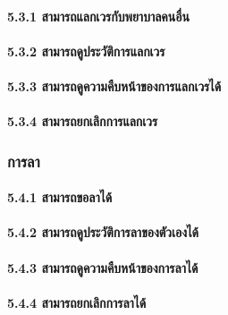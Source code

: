 \hspace{2.5cm}\paragraph{5.3.1 สามารถแลกเวรกับพยาบาลคนอื่น}

\hspace{2.5cm}\paragraph{5.3.2 สามารถดูประวัติการแลกเวร}

\hspace{2.5cm}\paragraph{5.3.3 สามารถดูความคืบหน้าของการแลกเวรได้}

\hspace{2.5cm}\paragraph{5.3.4 สามารถยกเลิกการแลกเวร}

\hspace{1cm}\subsubsection{การลา}

\hspace{2.5cm}\paragraph{5.4.1 สามารถขอลาได้}

\hspace{2.5cm}\paragraph{5.4.2 สามารถดูประวัติการลาของตัวเองได้}

\hspace{2.5cm}\paragraph{5.4.3 สามารถดูความคืบหน้าของการลาได้}

\hspace{2.5cm}\paragraph{5.4.4 สามารถยกเลิกการลาได้}

